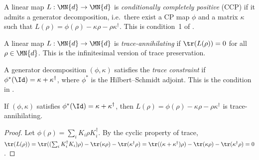 \begin{definition}\label{def:is_ccp}
    \leanok
    A linear map $L : \MN{d} \to \MN{d}$ is \emph{conditionally
        completely positive} (CCP) if it admits a generator decomposition,
    i.e.\ there exist a CP map $\phi$ and a matrix $\kappa$ such that
    $L(\rho) = \phi(\rho) - \kappa\rho - \rho\kappa^\dagger$.
    This is condition~1 of \cite[Proposition~7.2]{Wolf2012Quantum}.
\end{definition}

\begin{definition}\label{def:is_trace_annihilating}
    \leanok
    A linear map $L : \MN{d} \to \MN{d}$ is \emph{trace-annihilating} if
    $\tr(L(\rho)) = 0$ for all $\rho \in \MN{d}$.
    This is the infinitesimal version of trace preservation.
\end{definition}

\begin{definition}\label{def:is_trace_constraint}
    \leanok
    A generator decomposition $(\phi, \kappa)$ satisfies the
    \emph{trace constraint} if $\phi^*(\Id) = \kappa + \kappa^\dagger$,
    where $\phi^*$ is the Hilbert--Schmidt adjoint.
    This is the condition in \cite[Equation~(7.20)]{Wolf2012Quantum}.
\end{definition}

\begin{theorem}
    \label{thm:traceAnnihilating_of_traceConstraint}
    \leanok
    If $(\phi, \kappa)$ satisfies $\phi^*(\Id) = \kappa + \kappa^\dagger$,
    then $L(\rho) = \phi(\rho) - \kappa\rho - \rho\kappa^\dagger$ is
    trace-annihilating.
\end{theorem}

\begin{proof}
    \leanok
    Let $\phi(\rho) = \sum_i K_i\rho K_i^\dagger$.
    By the cyclic property of trace,
    $\tr(L(\rho))
        = \tr((\sum_i K_i^\dagger K_i)\rho)
        - \tr(\kappa\rho)
        - \tr(\kappa^\dagger\rho)
        = \tr((\kappa+\kappa^\dagger)\rho)
        - \tr(\kappa\rho)-\tr(\kappa^\dagger\rho)=0$.
\end{proof}

